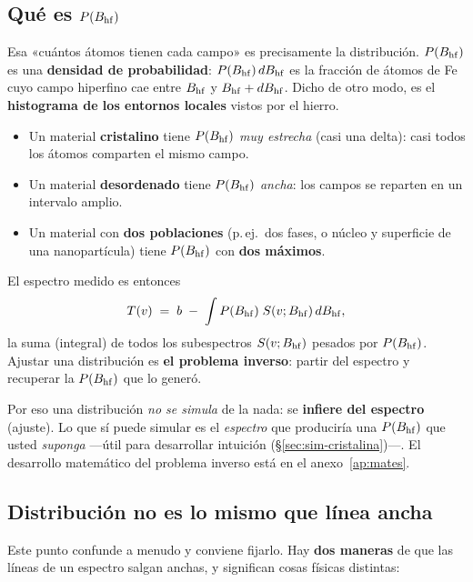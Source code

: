 \subsection{Qué es $P(B_{\mathrm{hf}})$}

Esa «cuántos átomos tienen cada campo» es precisamente la distribución. $P(B_{\mathrm{hf}})$
es una \textbf{densidad de probabilidad}: $P(B_{\mathrm{hf}})\,dB_{\mathrm{hf}}$ es la fracción de
átomos de Fe cuyo campo hiperfino cae entre $B_{\mathrm{hf}}$ y $B_{\mathrm{hf}} + dB_{\mathrm{hf}}$. Dicho de otro
modo, es el \textbf{histograma de los entornos locales} vistos por el hierro.

\begin{itemize}[nosep]
  \item Un material \textbf{cristalino} tiene $P(B_{\mathrm{hf}})$ \emph{muy estrecha} (casi
        una delta): casi todos los átomos comparten el mismo campo.
  \item Un material \textbf{desordenado} tiene $P(B_{\mathrm{hf}})$ \emph{ancha}: los campos
        se reparten en un intervalo amplio.
  \item Un material con \textbf{dos poblaciones} (p.\,ej.\ dos fases, o núcleo y
        superficie de una nanopartícula) tiene $P(B_{\mathrm{hf}})$ con \textbf{dos máximos}.
\end{itemize}

El espectro medido es entonces
\[
  T(v) \;=\; b \;-\; \int P(B_{\mathrm{hf}})\; S(v;B_{\mathrm{hf}})\, dB_{\mathrm{hf}},
\]
la suma (integral) de todos los subespectros $S(v;B_{\mathrm{hf}})$ pesados por $P(B_{\mathrm{hf}})$.
Ajustar una distribución es \textbf{el problema inverso}: partir del espectro y
recuperar la $P(B_{\mathrm{hf}})$ que lo generó.

\begin{nota}
Por eso una distribución \emph{no se simula} de la nada: se \textbf{infiere del
espectro} (ajuste). Lo que sí puede simular es el \emph{espectro} que produciría
una $P(B_{\mathrm{hf}})$ que usted \emph{suponga} —útil para desarrollar intuición
(§\ref{sec:sim-cristalina})—. El desarrollo matemático del problema inverso está
en el anexo~\ref{ap:mates}.
\end{nota}

\subsection{Distribución no es lo mismo que línea ancha}

Este punto confunde a menudo y conviene fijarlo. Hay \textbf{dos maneras} de que
las líneas de un espectro salgan anchas, y significan cosas físicas distintas:

